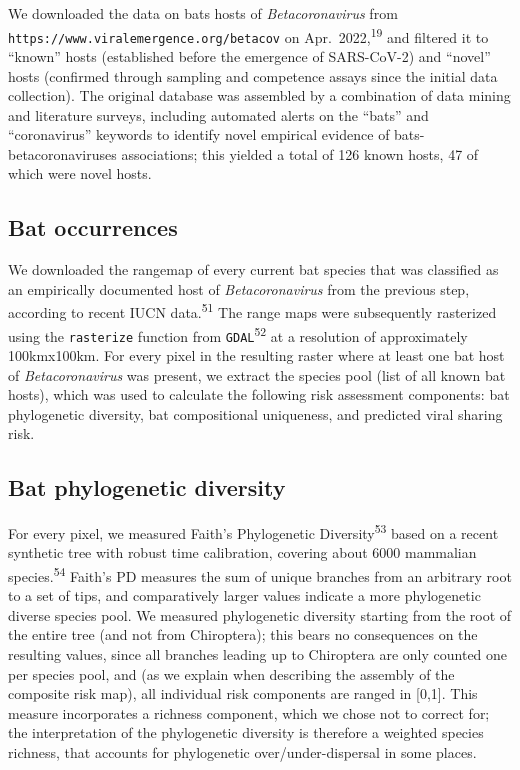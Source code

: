 \documentclass[11pt]{article}
\begin{document}
We downloaded the data on bats hosts of \emph{Betacoronavirus} from
\texttt{https://www.viralemergence.org/betacov} on
Apr.~2022,\textsuperscript{19} and filtered it to ``known'' hosts
(established before the emergence of SARS-CoV-2) and ``novel'' hosts
(confirmed through sampling and competence assays since the initial data
collection). The original database was assembled by a combination of
data mining and literature surveys, including automated alerts on the
``bats'' and ``coronavirus'' keywords to identify novel empirical
evidence of bats-betacoronaviruses associations; this yielded a total of
126 known hosts, 47 of which were novel hosts.

\hypertarget{bat-occurrences}{%
\subsection{Bat occurrences}\label{bat-occurrences}}

We downloaded the rangemap of every current bat species that was
classified as an empirically documented host of \emph{Betacoronavirus}
from the previous step, according to recent IUCN
data.\textsuperscript{51} The range maps were subsequently rasterized
using the \texttt{rasterize} function from
\texttt{GDAL}\textsuperscript{52} at a resolution of approximately
100kmx100km. For every pixel in the resulting raster where at least one
bat host of \emph{Betacoronavirus} was present, we extract the species
pool (list of all known bat hosts), which was used to calculate the
following risk assessment components: bat phylogenetic diversity, bat
compositional uniqueness, and predicted viral sharing risk.

\hypertarget{bat-phylogenetic-diversity}{%
\subsection{Bat phylogenetic
diversity}\label{bat-phylogenetic-diversity}}

For every pixel, we measured Faith's Phylogenetic
Diversity\textsuperscript{53} based on a recent synthetic tree with
robust time calibration, covering about 6000 mammalian
species.\textsuperscript{54} Faith's PD measures the sum of unique
branches from an arbitrary root to a set of tips, and comparatively
larger values indicate a more phylogenetic diverse species pool. We
measured phylogenetic diversity starting from the root of the entire
tree (and not from Chiroptera); this bears no consequences on the
resulting values, since all branches leading up to Chiroptera are only
counted one per species pool, and (as we explain when describing the
assembly of the composite risk map), all individual risk components are
ranged in {[}0,1{]}. This measure incorporates a richness component,
which we chose not to correct for; the interpretation of the
phylogenetic diversity is therefore a weighted species richness, that
accounts for phylogenetic over/under-dispersal in some places.
\end{document}
